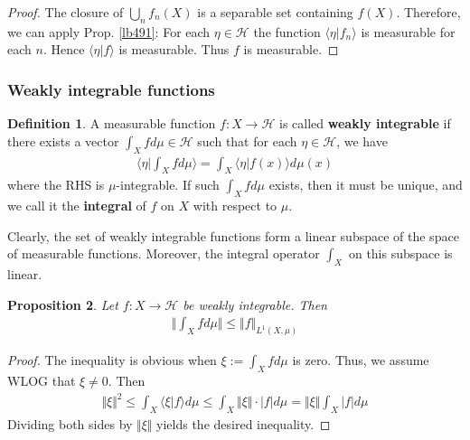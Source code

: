 \documentclass[12pt,b5paper,notitlepage]{article}
\theoremstyle{definition}
\newtheorem{df}{Definition}[subsection]
\theoremstyle{plain}
\newtheorem{pp}[df]{Proposition}
\newcommand{\bk}[1]{\langle {#1}\rangle}
\newcommand{\Bigbk}[1]{\Big\langle {#1}\Big\rangle}
\newcommand{\MH}{\mathcal H}
\numberwithin{equation}{section}
\begin{document}
\begin{subappendices}
\begin{proof}
The closure of $\bigcup_n f_n(X)$ is a separable set containing $f(X)$. Therefore, we can apply Prop. \ref{lb491}: For each $\eta\in \MH$ the function $\bk{\eta|f_n}$ is measurable for each $n$. Hence $\bk{\eta|f}$ is measurable. Thus $f$ is measurable. 
\end{proof}




\subsubsection{Weakly integrable functions}


\begin{df}
A measurable function $f:X\rightarrow \MH$ is called \textbf{weakly integrable}  if there exists a vector $\int_X fd\mu\in \MH$ such that for each $\eta\in \MH$, we have
\begin{align*}
\Bigbk{\eta\Big|\int_X fd\mu}=\int_X\bk{\eta|f(x)}d\mu(x)
\end{align*} 
where the RHS is $\mu$-integrable. If such $\int_X fd\mu$ exists, then it must be unique, and we call it the \textbf{integral}  of $f$ on $X$ with respect to $\mu$.
\end{df}




Clearly, the set of weakly integrable functions form a linear subspace of the space of measurable functions. Moreover, the integral operator $\int_X$ on this subspace is linear.









\begin{pp}\label{lb493}
Let $f:X\rightarrow \MH$ be weakly integrable. Then
\begin{align*}
\Big\Vert\int_Xfd\mu\Big\Vert\leq \Vert f\Vert_{L^1(X,\mu)}
\end{align*}
\end{pp}


\begin{proof}
The inequality is obvious when $\xi:=\int_Xfd\mu$ is zero. Thus, we assume WLOG that $\xi\neq0$. Then
\begin{align*}
\Vert\xi\Vert^2\leq\int_X\bk{\xi|f}d\mu\leq\int_X \Vert\xi\Vert\cdot |f|d\mu= \Vert\xi\Vert\int_X|f|d\mu
\end{align*}
Dividing both sides by $\Vert\xi\Vert$ yields the desired inequality.
\end{proof}


\end{subappendices}
\end{document}
